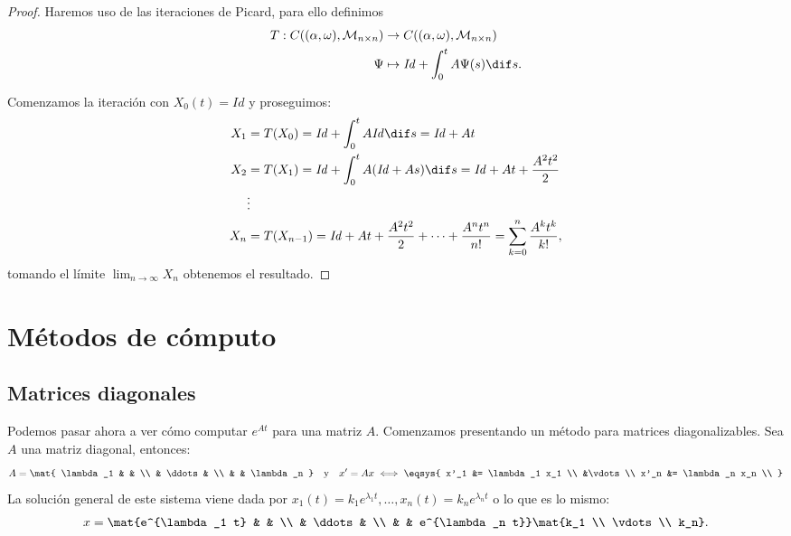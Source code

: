 \documentclass[../main.tex]{subfiles}
\begin{document}
\begin{proof}
	Haremos uso de las iteraciones de Picard, para ello definimos
	\begin{align*}
		T : C((\alpha, \omega), \mathcal{M}_{n \times n}) &\to 
			C((\alpha, \omega), \mathcal{M}_{n \times n}) \\
		\Psi &\mapsto \mathit{Id} + \int_0^t A \Psi(s) \dif s.
	\end{align*}

	Comenzamos la iteración con \(X_0(t) = \mathit{Id}\) y proseguimos:
	\begin{align*}
		X_1 &= T(X_0) = \mathit{Id} + \int_0^t A \mathit{Id} \dif s = 
			\mathit{Id} + At \\
		X_2 &= T(X_1) = \mathit{Id} + \int_0^t A (\mathit{Id} + As) \dif s = 
			\mathit{Id} + At + \frac{A^2 t^2}{2} \\
		&\vdots \\
		X_n &= T(X_{n - 1}) =
			\mathit{Id} + At + \frac{A^2 t^2}{2} + \cdots + \frac{A^n t^n}{n!}
			= \sum_{k = 0}^n \frac{A^k t^k}{k!},
	\end{align*}
	tomando el límite \(\lim_{n \to \infty} X_n\) obtenemos el resultado.
\end{proof}

\section{Métodos de cómputo}

\subsection{Matrices diagonales}

Podemos pasar ahora a ver cómo computar \(e^{At}\) para una matriz \(A\).
Comenzamos presentando un método para matrices diagonalizables. Sea \(A\) una
matriz diagonal, entonces:
\[A = \mat{
	\lambda_1 & & \\
	& \ddots & \\
	& & \lambda_n
	}
	\quad \text{y} \quad
	x' = Ax \iff
	\eqsys{
		x'_1 &= \lambda_1 x_1 \\
		&\vdots \\
		x'_n &= \lambda_n x_n \\
		}
	\]
La solución general de este sistema viene dada por 
\(x_1(t) = k_1 e^{\lambda_1 t}, \dots, x_n(t) = k_n e^{\lambda_n t}\) o lo que es
lo mismo:
\[x = \mat{e^{\lambda_1 t} & & \\ & \ddots & \\ & & e^{\lambda_n t}} 
	\mat{k_1 \\ \vdots \\ k_n}.\]
\end{document}
